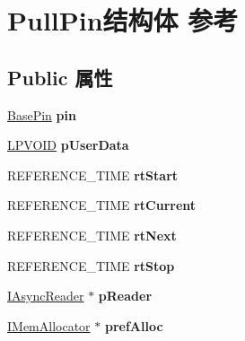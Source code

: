 \hypertarget{struct_pull_pin}{}\section{Pull\+Pin结构体 参考}
\label{struct_pull_pin}
\subsection*{Public 属性}
\begin{DoxyCompactItemize}
\item 
\mbox{\label{struct_pull_pin_a9745988b141383f66084aba881c6431c}} 
\hyperlink{struct_base_pin}{Base\+Pin} {\bfseries pin}
\item 
\mbox{\label{struct_pull_pin_a4c46a26c06e17ea7b80087c696e24939}} 
\hyperlink{interfacevoid}{L\+P\+V\+O\+ID} {\bfseries p\+User\+Data}
\item 
\mbox{\label{struct_pull_pin_ae1d245e8d832512c8b93a0093e07815b}} 
R\+E\+F\+E\+R\+E\+N\+C\+E\+\_\+\+T\+I\+ME {\bfseries rt\+Start}
\item 
\mbox{\label{struct_pull_pin_a8e98c68287e74a126b2be80c59361e22}} 
R\+E\+F\+E\+R\+E\+N\+C\+E\+\_\+\+T\+I\+ME {\bfseries rt\+Current}
\item 
\mbox{\label{struct_pull_pin_a0bb370d4dd55e227d0195e6af11c94c3}} 
R\+E\+F\+E\+R\+E\+N\+C\+E\+\_\+\+T\+I\+ME {\bfseries rt\+Next}
\item 
\mbox{\label{struct_pull_pin_a1b140432dcfa87480ce8c8e4979d1447}} 
R\+E\+F\+E\+R\+E\+N\+C\+E\+\_\+\+T\+I\+ME {\bfseries rt\+Stop}
\item 
\mbox{\label{struct_pull_pin_ab1c8cf52a5ed8c9cba7c0177c9a413f3}} 
\hyperlink{interface_i_async_reader}{I\+Async\+Reader} $\ast$ {\bfseries p\+Reader}
\item 
\mbox{\label{struct_pull_pin_aed3c081731883bb05f8788980a449aba}} 
\hyperlink{interface_i_mem_allocator}{I\+Mem\+Allocator} $\ast$ {\bfseries pref\+Alloc}
\item 
\mbox{\label{struct_pull_pin_a8005c1c97fd8f06315bb5c3f69072fe0}} 

\end{DoxyCompactItemize}
